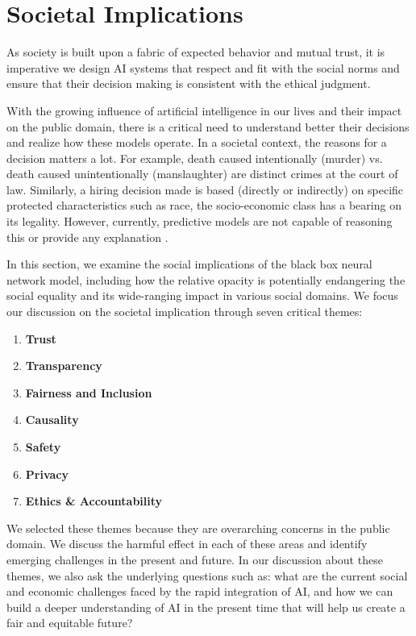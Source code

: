 \section{Societal Implications}

As society is built upon a fabric of expected behavior and mutual trust, it is imperative we design AI systems that respect and fit with the social norms and ensure that their decision making is consistent with the ethical judgment. 

With the growing influence of artificial intelligence in our lives and their impact on the public domain, there is a critical need to understand better their decisions and realize how these models operate.  In a societal context, the reasons for a decision matters a lot. For example, death caused intentionally (murder) vs. death caused unintentionally (manslaughter) are distinct crimes at the court of law. Similarly, a hiring decision made is based (directly or indirectly) on specific protected characteristics such as race, the socio-economic class has a bearing on its legality. However, currently, predictive models are not capable of reasoning this or provide any explanation \cite{molnar}.

In this section, we examine the social implications of the black box neural network model, including how the relative opacity is potentially endangering the social equality and its wide-ranging impact in various social domains. We focus our discussion on the societal implication through seven critical themes:

\begin{enumerate}
\item \textbf{Trust}
\item  \textbf{Transparency}
\item \textbf{Fairness and Inclusion}
\item \textbf{Causality}
\item \textbf{Safety}
\item \textbf{Privacy}
\item \textbf{Ethics \& Accountability}
\end{enumerate}

We selected these themes because they are overarching concerns in the public domain. We discuss the harmful effect in each of these areas and identify emerging challenges in the present and future. In our discussion about these themes, we also ask the underlying questions such as: what are the current social and economic challenges faced by the rapid integration of AI, and how we can build a deeper understanding of AI in the present time that will help us create a fair and equitable future? \cite{Solon2017}

